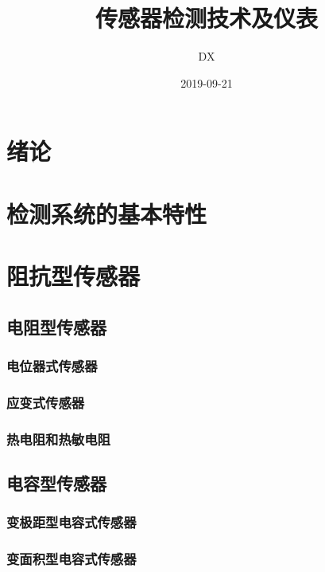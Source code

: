 \documentclass[11pt]{article}
\begin{document}
\title{传感器检测技术及仪表}
\author{DX}
\date{2019-09-21}
\maketitle
\tableofcontents
\section{绪论}

\section{检测系统的基本特性}

\section{阻抗型传感器}
\subsection{电阻型传感器}
\subsubsection{电位器式传感器}%
\label{ssub:dian_wei_qi_shi_chuan_gan_qi_}

\subsubsection{应变式传感器}%
\label{ssub:ying_bian_shi_chuan_gan_qi_}

\subsubsection{热电阻和热敏电阻}%
\label{ssub:re_dian_zu_he_re_min_dian_zu_}

\subsection{电容型传感器}
\subsubsection{变极距型电容式传感器}%
\label{ssub:bian_ji_ju_xing_dian_rong_shi_chuan_gan_qi_}

\subsubsection{变面积型电容式传感器}%
\label{ssub:bian_mian_ji_xing_dian_rong_shi_chuan_gan_qi_}
\end{document}
